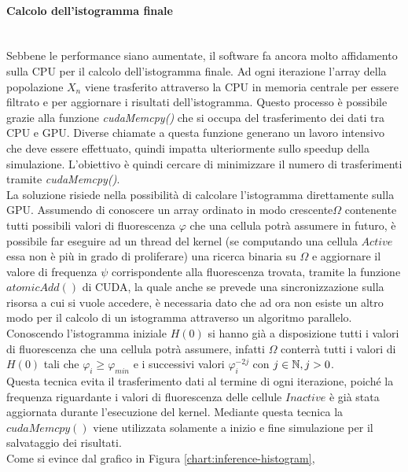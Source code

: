 \paragraph{Calcolo dell'istogramma finale}\mbox{}
\\
Sebbene le performance siano aumentate, il software fa ancora molto affidamento
sulla CPU per il calcolo dell'istogramma finale.
Ad ogni iterazione l'array della popolazione $X_{n}$ viene trasferito
attraverso la CPU in memoria centrale per essere filtrato e per aggiornare i
risultati dell'istogramma. Questo processo è possibile grazie alla funzione
\textit{cudaMemcpy()} che si occupa del trasferimento dei dati tra CPU e GPU.
Diverse chiamate a questa funzione generano un lavoro intensivo che deve essere
effettuato, quindi impatta ulteriormente sullo speedup della simulazione.
L'obiettivo è quindi cercare di minimizzare il numero di trasferimenti tramite
\textit{cudaMemcpy()}.
\\
La soluzione risiede nella possibilità di calcolare l'istogramma direttamente
sulla GPU. Assumendo di conoscere un array ordinato in modo crescente$\Omega$
contenente tutti possibili valori di fluorescenza
$\varphi$ che una cellula potrà assumere in futuro, è possibile far eseguire
ad un thread del kernel (se computando una cellula $Active$ essa non è più in
grado di proliferare) una ricerca binaria su $\Omega$ e aggiornare
il valore di frequenza $\psi$ corrispondente alla fluorescenza trovata, tramite
la funzione $atomicAdd()$ di CUDA, la quale anche se prevede una
sincronizzazione sulla risorsa a cui si vuole accedere, è necessaria dato che
ad ora non esiste un altro modo per il calcolo di un istogramma attraverso un
algoritmo parallelo.
\\
Conoscendo l'istogramma iniziale $H(0)$ si hanno già a disposizione
tutti i valori di fluorescenza che una cellula potrà assumere, infatti
$\Omega$ conterrà tutti i valori di $H(0)$ tali che $\varphi_{i} \geqslant
\varphi_{min}$ e i successivi valori $\varphi_{i}^{-2j}$ con $j \in \mathbb{N}, j > 0$.
\\
Questa tecnica evita il trasferimento dati al termine di ogni iterazione, poiché
la frequenza riguardante i valori di fluorescenza delle cellule $Inactive$
è già stata aggiornata durante l'esecuzione del kernel.
Mediante questa tecnica la $cudaMemcpy()$ viene utilizzata solamente a inizio
e fine simulazione per il salvataggio dei risultati.
\\
Come si evince dal grafico in Figura \ref{chart:inference-histogram}, 
